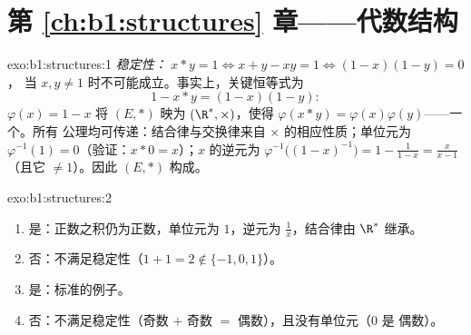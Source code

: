 \section*{第 \ref{ch:b1:structures} 章——代数结构}

\begin{solution}{exo:b1:structures:1}
\emph{稳定性：} $x * y = 1 \iff x + y - xy = 1 \iff (1-x)(1-y) = 0$，
当 $x, y \neq 1$ 时不可能成立。事实上，关键恒等式为
\[
1 - x * y = (1 - x)(1 - y):
\]
 $\varphi(x) = 1 - x$ 将 $(E, *)$ 映为 $(\R^*, \times)$，使得
$\varphi(x * y) = \varphi(x)\varphi(y)$——一个。所有
公理均可传递：结合律与交换律来自
$\times$ 的相应性质；单位元为 $\varphi^{-1}(1) = 0$（验证：$x *
0 = x$）；$x$ 的逆元为 $\varphi^{-1}\bigl((1-x)^{-1}\bigr) =
1 - \frac{1}{1-x} = \frac{x}{x - 1}$（且它 $\neq 1$）。因此 $(E, *)$
构成。
\end{solution}

\begin{solution}{exo:b1:structures:2}
\begin{enumerate}
  \item 是：正数之积仍为正数，单位元为 $1$，逆元为
        $\frac 1x$，结合律由 $\R^*$ 继承。
  \item 否：不满足稳定性（$1 + 1 = 2 \notin \{-1,0,1\}$）。
  \item 是：标准的例子。
  \item 否：不满足稳定性（奇数 $+$ 奇数 $=$ 偶数），且没有单位元（$0$ 是
        偶数）。
\end{enumerate}
\end{solution}

